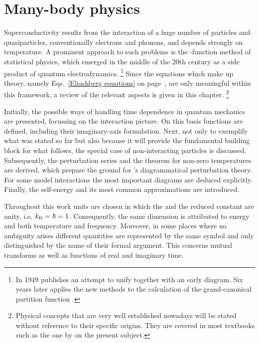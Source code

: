 
\chapter{Many-body physics}

Superconductivity results from the interaction of a huge number of particles and
quasiparticles, conventionally electrons and phonons, and depends strongly on
temperature. A prominent approach to such problems is the -function
method of statistical physics, which emerged in the middle of the 20th century
as a side product of quantum electrodynamics.%
%
\footnote{In 1949  publishes an attempt to unify  \cite{Dyson49} together with an
early  diagram. Six years later  applies the new
methods to the calculation of the grand-canonical partition function
\cite{Matsubara55}.}
%
Since the equations which make up  theory, namely
Eqs.~\ref{Eliashberg equations} on page~\pageref{Eliashberg equations}, are only
meaningful within this framework, a review of the relevant aspects is given in
this chapter.%
%
\footnote{Physical concepts that are very well established nowadays will be
stated without reference to their specific origins. They are covered in most
textbooks such as the one by  \cite{Mahan00} on the present
subject.}

Initially, the possible ways of handling time dependence in quantum mechanics
are presented, focussing on the interaction picture. On this basis 
functions are defined, including their imaginary-axis formulation. Next, not
only to exemplify what was stated so far but also because it will provide the
fundamental building block for what follows, the special case of non-interacting
particles is discussed. Subsequently, the perturbation series and the
 theorem for non-zero temperatures are derived, which prepare the
ground for 's diagrammatical perturbation theory. For some model
interactions the most important diagrams are deduced explicitly. Finally, the
self-energy and its most common approximations are introduced.

Throughout this work units are chosen in which the  and the
reduced  constant are unity, i.e. $k \sb{\text{B}} = \hbar = 1$.
Consequently, the same dimension is attributed to energy and both temperature
and frequency. Moreover, in some places where no ambiguity arises different
quantities are represented by the same symbol and only distinguished by the name
of their formal argument. This concerns mutual  transforms as well
as functions of real and imaginary time.

